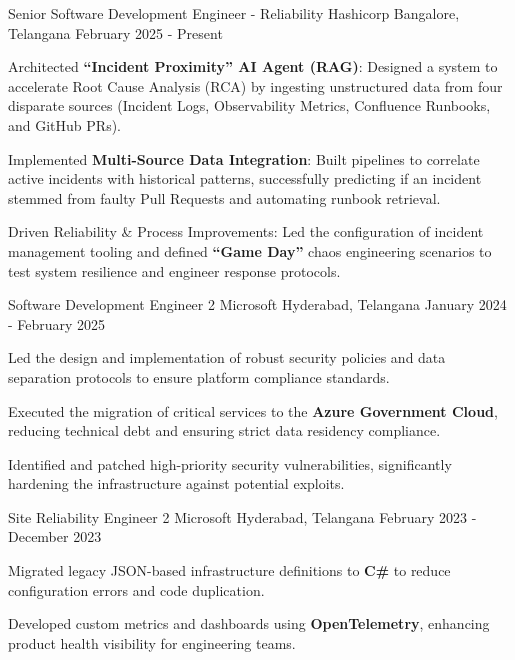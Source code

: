 
\begin{cventries}
  \cventry
  { Senior Software Development Engineer - Reliability}
  {Hashicorp}
  {Bangalore, Telangana}
  {February 2025 - Present}
  {
    \begin{cvitems}
      \item {Architected \textbf{``Incident Proximity'' AI Agent (RAG)}: Designed a system to accelerate Root Cause Analysis (RCA) by ingesting unstructured data from four disparate sources (Incident Logs, Observability Metrics, Confluence Runbooks, and GitHub PRs).}
      \item {Implemented \textbf{Multi-Source Data Integration}: Built pipelines to correlate active incidents with historical patterns, successfully predicting if an incident stemmed from faulty Pull Requests and automating runbook retrieval.}
      \item {Driven Reliability \& Process Improvements: Led the configuration of incident management tooling and defined \textbf{``Game Day''} chaos engineering scenarios to test system resilience and engineer response protocols.}
    \end{cvitems}
  }
  \cventry
  { Software Development Engineer 2}
  {Microsoft}
  {Hyderabad, Telangana}
  {January 2024 - February 2025}
  {
  \begin{cvitems}
    \item {Led the design and implementation of robust security policies and data separation protocols to ensure platform compliance standards.}
    \item {Executed the migration of critical services to the \textbf{Azure Government Cloud}, reducing technical debt and ensuring strict data residency compliance.}
    \item {Identified and patched high-priority security vulnerabilities, significantly hardening the infrastructure against potential exploits.}
  \end{cvitems}
  }
  \cventry
  {Site Reliability Engineer 2} %
  {Microsoft} %
  {Hyderabad, Telangana} %
  {February 2023 - December 2023} %
  {
  \begin{cvitems} %
    \item {Migrated legacy JSON-based infrastructure definitions to \textbf{C\#} to reduce configuration errors and code duplication.}
    \item {Developed custom metrics and dashboards using \textbf{OpenTelemetry}, enhancing product health visibility for engineering teams.}

\end{cvitems}}
\end{cventries}
